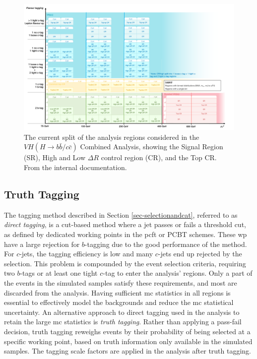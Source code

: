 \newpage

\begin{figure}
    \centering
    \includegraphics[width=\textwidth]{Images/VH/Cat/VH_analysis_cat.pdf}
    \caption{The current split of the analysis regions considered in the $VH (H\rightarrow b\bar{b}/c\bar{c})$ Combined Analysis, showing the Signal Region (SR), High and Low $\Delta R$ control region (CR), and the Top CR. From the internal documentation.} 
    \label{fig:ana-strat-det}
\end{figure}

\clearpage

\subsection{Truth Tagging}
The tagging method described in Section \ref{sec-selectionandcat}, referred to as \textit{direct tagging}, is a cut-based method where a jet passes or fails a threshold cut, as defined by dedicated working points in the \gls{pcft} or PCBT schemes. These \gls{wp} have a large rejection for $b$-tagging due to the good performance of the method. For $c$-jets, the tagging efficiency is low and many $c$-jets end up rejected by the selection. This problem is compounded by the event selection criteria, requiring two $b$-tags or at least one tight $c$-tag to enter the analysis' regions. Only a part of the events in the simulated samples satisfy these requirements, and most are discarded from the analysis. Having sufficient \gls{mc} statistics in all regions is essential to effectively model the backgrounds and reduce the \gls{mc} statistical uncertainty. An alternative approach to direct tagging used in the analysis to retain the large \gls{mc} statistics is \textit{truth tagging}. Rather than applying a pass-fail decision, truth tagging reweighs events by their probability of being selected at a specific working point, based on truth information only available in the simulated samples. The tagging scale factors are applied in the analysis after truth tagging. \\

